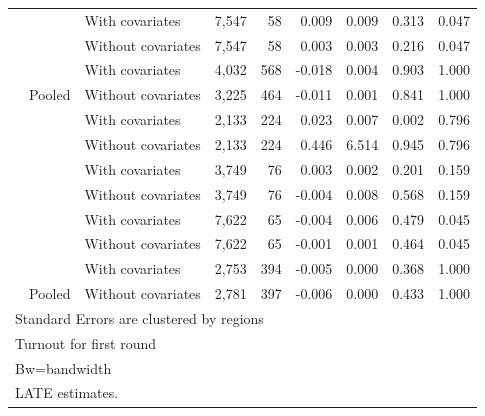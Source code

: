\documentclass[
  12pt,
]{article}
\begin{document}
\begin{table}[H]
\begin{tabular}[t]{lllrrrrrr}
 &  & With covariates & 7,547 & 58 & 0.009 & 0.009 & 0.313 & 0.047\\


 & \multirow{-2}{*}{\raggedright\arraybackslash 60000} & Without covariates & 7,547 & 58 & 0.003 & 0.003 & 0.216 & 0.047\\


 &  & With covariates & 4,032 & 568 & -0.018 & 0.004 & 0.903 & 1.000\\


\multirow{-8}{*}{\raggedright\arraybackslash 2010} & \multirow{-2}{*}{\raggedright\arraybackslash Pooled} & Without covariates & 3,225 & 464 & -0.011 & 0.001 & 0.841 & 1.000\\

\cmidrule{1-9}
 &  & With covariates & 2,133 & 224 & 0.023 & 0.007 & 0.002 & 0.796\\


 & \multirow{-2}{*}{\raggedright\arraybackslash 20000} & Without covariates & 2,133 & 224 & 0.446 & 6.514 & 0.945 & 0.796\\


 &  & With covariates & 3,749 & 76 & 0.003 & 0.002 & 0.201 & 0.159\\


 & \multirow{-2}{*}{\raggedright\arraybackslash 40000} & Without covariates & 3,749 & 76 & -0.004 & 0.008 & 0.568 & 0.159\\


 &  & With covariates & 7,622 & 65 & -0.004 & 0.006 & 0.479 & 0.045\\


 & \multirow{-2}{*}{\raggedright\arraybackslash 60000} & Without covariates & 7,622 & 65 & -0.001 & 0.001 & 0.464 & 0.045\\


 &  & With covariates & 2,753 & 394 & -0.005 & 0.000 & 0.368 & 1.000\\


\multirow{-8}{*}{\raggedright\arraybackslash 2012} & \multirow{-2}{*}{\raggedright\arraybackslash Pooled} & Without covariates & 2,781 & 397 & -0.006 & 0.000 & 0.433 & 1.000\\
\bottomrule
\multicolumn{9}{l}{\rule{0pt}{1em}Standard Errors are clustered by regions}\\
\multicolumn{9}{l}{\rule{0pt}{1em}Turnout for first round}\\
\multicolumn{9}{l}{\rule{0pt}{1em}Bw=bandwidth}\\
\multicolumn{9}{l}{\rule{0pt}{1em}LATE estimates.}\\
\end{tabular}
\end{table}
\end{document}
